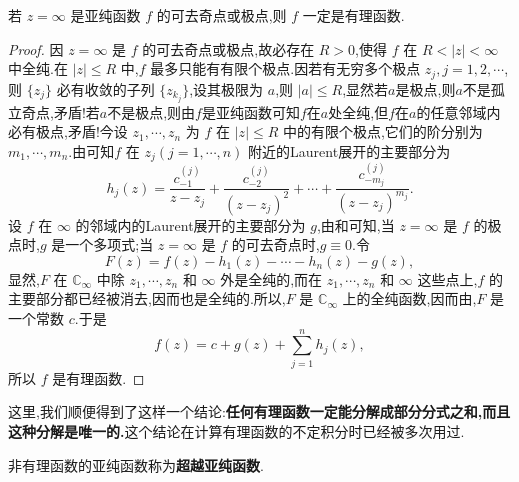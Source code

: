 \documentclass[../../main.tex]{subfiles}%
\begin{document}
\begin{theorem}\label{theorem:定理5.3.3}
若 \( z = \infty \) 是亚纯函数 \( f \) 的可去奇点或极点,则 \( f \) 一定是有理函数.
\end{theorem}
\begin{proof}
因 \( z = \infty \) 是 \( f \) 的可去奇点或极点,故必存在 \( R > 0 \),使得 \( f \) 在 \( R < |z| < \infty \) 中全纯.在 \( |z| \leqslant R \) 中,\( f \) 最多只能有有限个极点.因若有无穷多个极点 \( z_j, j = 1, 2, \cdots \),则 \( \{ z_j \} \) 必有收敛的子列 \( \{ z_{k_j} \} \),设其极限为 \( a \),则 \( |a| \leqslant R \),显然若$a$是极点,则\( a \)不是孤立奇点,矛盾!若$a$不是极点,则由$f$是亚纯函数可知$f$在$a$处全纯,但$f$在$a$的任意邻域内必有极点,矛盾!今设 \( z_1, \cdots, z_n \) 为 \( f \) 在 \( |z| \leqslant R \) 中的有限个极点,它们的阶分别为 \( m_1, \cdots, m_n \).由可知\( f \) 在 \( z_j (j = 1, \cdots, n) \) 附近的Laurent展开的主要部分为
\[
h_j(z) = \frac{c_{-1}^{(j)}}{z - z_j} + \frac{c_{-2}^{(j)}}{(z - z_j)^2} + \cdots + \frac{c_{-m_j}^{(j)}}{(z - z_j)^{m_j}}.
\]
设 \( f \) 在 \( \infty \) 的邻域内的Laurent展开的主要部分为 \( g \),由和可知,当 \( z = \infty \) 是 \( f \) 的极点时,\( g \) 是一个多项式;当 \( z = \infty \) 是 \( f \) 的可去奇点时,\( g \equiv 0 \).令
\[
F(z) = f(z) - h_1(z) - \cdots - h_n(z) - g(z),
\]
显然,\( F \) 在 \( \mathbb{C}_{\infty} \) 中除 \( z_1, \cdots, z_n \) 和 \( \infty \) 外是全纯的,而在 \( z_1, \cdots, z_n \) 和 \( \infty \) 这些点上,\( f \) 的主要部分都已经被消去,因而也是全纯的.所以,\( F \) 是 \( \mathbb{C}_{\infty} \) 上的全纯函数,因而由,\( F \) 是一个常数 \( c \).于是
\[
f(z) = c + g(z) + \sum_{j = 1}^{n} h_j(z),
\]
所以 \( f \) 是有理函数.
\end{proof}
\begin{remark}
这里,我们顺便得到了这样一个结论:\textbf{任何有理函数一定能分解成部分分式之和,而且这种分解是唯一的.}这个结论在计算有理函数的不定积分时已经被多次用过.
\end{remark}

\begin{definition}
非有理函数的亚纯函数称为\textbf{超越亚纯函数}.
\end{definition}
\end{document}
